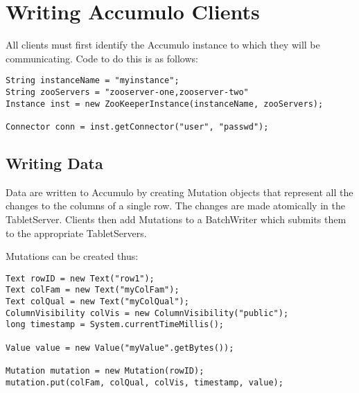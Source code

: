 
%
%

\chapter{Writing Accumulo Clients}

All clients must first identify the Accumulo instance to which they will be
communicating. Code to do this is as follows:

\small
\begin{verbatim}
String instanceName = "myinstance";
String zooServers = "zooserver-one,zooserver-two"
Instance inst = new ZooKeeperInstance(instanceName, zooServers);

Connector conn = inst.getConnector("user", "passwd");
\end{verbatim}
\normalsize

\section{Writing Data}

Data are written to Accumulo by creating Mutation objects that represent all the
changes to the columns of a single row. The changes are made atomically in the
TabletServer. Clients then add Mutations to a BatchWriter which submits them to
the appropriate TabletServers.

Mutations can be created thus:

\small
\begin{verbatim}
Text rowID = new Text("row1");
Text colFam = new Text("myColFam");
Text colQual = new Text("myColQual");
ColumnVisibility colVis = new ColumnVisibility("public");
long timestamp = System.currentTimeMillis();

Value value = new Value("myValue".getBytes());

Mutation mutation = new Mutation(rowID);
mutation.put(colFam, colQual, colVis, timestamp, value);
\end{verbatim}
\normalsize

